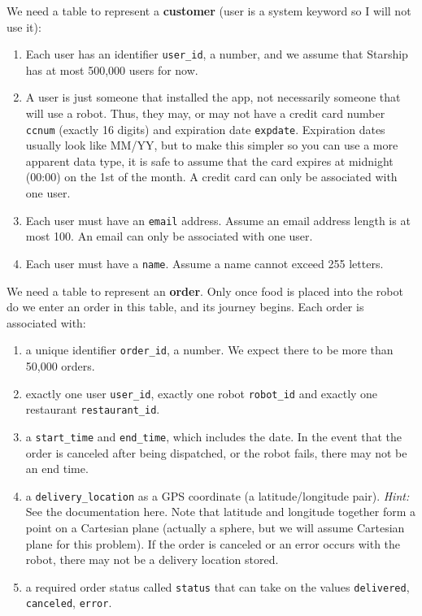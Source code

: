 \documentclass{report}
\renewcommand{\it}[1]{\textit{{#1}}}
\renewcommand{\bf}[1]{\textbf{{#1}}}
\renewcommand{\tt}[1]{\texttt{{#1}}}
\begin{document}
\noindent We need a table to represent a \bf{customer} (user is a system keyword so I will not use it):

\begin{enumerate} 
    \item Each user has an identifier \tt{user\_id}, a number, and we assume that Starship has at
        most 500,000 users for now. 
    \item A user is just someone that installed the app,
        not necessarily someone that will use a robot. Thus, they may, or may not have a credit card
        number \tt{ccnum} (exactly 16 digits) and expiration date \tt{expdate}. Expiration dates
        usually look like MM/YY, but to make this simpler so you can use a more apparent data type, it
        is safe to assume that the card expires at midnight (00:00) on the 1st of the month. A credit
        card can only be associated with one user. 
    \item Each user must have an \tt{email} address.
        Assume an email address length is at most 100. An email can only be associated with one user. 
    \item Each user must have a \tt{name}. Assume a name cannot exceed 255 letters. 
\end{enumerate}

\noindent We need a table to represent an \bf{order}. Only once food is placed into the robot do we
enter an order in this table, and its journey begins. Each order is associated with:

\begin{enumerate} 
    \item a unique identifier \tt{order\_id}, a number. We expect there to be more than 50,000
        orders. 
    \item exactly one user \tt{user\_id}, exactly one robot \tt{robot\_id} and exactly one
        restaurant \tt{restaurant\_id}. 
    \item a \tt{start\_time} and \tt{end\_time}, which includes the date. In the event that the
        order is canceled after being dispatched, or the robot fails, there may not be an end time.
    \item a \tt{delivery\_location} as a GPS coordinate (a latitude/longitude pair). \it{Hint:} See
        the documentation here. Note that latitude and longitude together form a point on a
        Cartesian plane (actually a sphere, but we will assume Cartesian plane for this problem). If
        the order is canceled or an error occurs with the robot, there may not be a delivery
        location stored. 
    \item a required order status called \tt{status} that can take on the values \tt{delivered},
        \tt{canceled}, \tt{error}. 
\end{enumerate}
\end{document}
